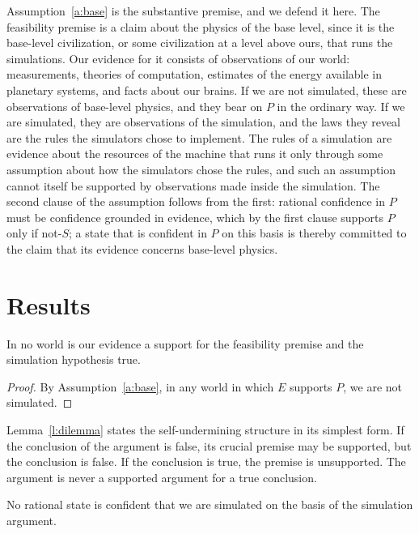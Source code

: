 \documentclass{situationist-preprint}
\begin{document}
Assumption~\ref{a:base} is the substantive premise, and we defend it here. The feasibility premise is a claim about the physics of the base level, since it is the base-level civilization, or some civilization at a level above ours, that runs the simulations. Our evidence for it consists of observations of our world: measurements, theories of computation, estimates of the energy available in planetary systems, and facts about our brains. If we are not simulated, these are observations of base-level physics, and they bear on $P$ in the ordinary way. If we are simulated, they are observations of the simulation, and the laws they reveal are the rules the simulators chose to implement. The rules of a simulation are evidence about the resources of the machine that runs it only through some assumption about how the simulators chose the rules, and such an assumption cannot itself be supported by observations made inside the simulation. The second clause of the assumption follows from the first: rational confidence in $P$ must be confidence grounded in evidence, which by the first clause supports $P$ only if not-$S$; a state that is confident in $P$ on this basis is thereby committed to the claim that its evidence concerns base-level physics.

\section{Results}

\begin{lemma}\label{l:dilemma}
In no world is our evidence a support for the feasibility premise and the simulation hypothesis true.
\end{lemma}

\begin{proof}
By Assumption~\ref{a:base}, in any world in which $E$ supports $P$, we are not simulated.
\end{proof}

Lemma~\ref{l:dilemma} states the self-undermining structure in its simplest form. If the conclusion of the argument is false, its crucial premise may be supported, but the conclusion is false. If the conclusion is true, the premise is unsupported. The argument is never a supported argument for a true conclusion.

\begin{theorem}\label{t:main}
No rational state is confident that we are simulated on the basis of the simulation argument.
\end{theorem}
\end{document}
